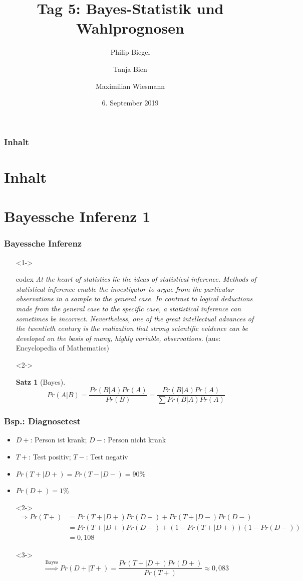 \documentclass[aspectratio=169,xcolor=dvipsnames]{beamer}
\title[Bayes-Statistik \& Wahlprognosen]{\textbf{Tag 5: Bayes-Statistik und Wahlprognosen}}
\author[Philip \and Tanja \and Maximilian]{Philip Biegel \and Tanja Bien \and Maximilian Wiesmann}
\institute[]{Sommerakademie der Studienstiftung Olang - Arbeitsgruppe 4: Empirische Wahlforschung und Wahlprognosen}
\date{6. September 2019}
\newtheorem{satz}{Satz}
\begin{document}
\begin{frame}
\titlepage
\end{frame}

\begin{frame}
\frametitle{Inhalt}
\section[Inhalt]{Inhalt}
\tableofcontents
\end{frame}

\section{Bayessche Inferenz 1}
\begin{frame}
\frametitle{Bayessche Inferenz}
\begin{itemize}
	\item[]<1-> 
	\begin{beamercolorbox}[sep=0.5em,wd=\textwidth,shadow=true,rounded=true]{codex}
		\textit{\glqq At the heart of statistics lie the ideas of statistical inference. Methods of statistical inference enable the investigator to argue from the particular observations in a sample to the general case. In contrast to logical deductions made from the general case to the specific case, a statistical inference can sometimes be incorrect. Nevertheless, one of the great intellectual advances of the twentieth century is the realization that strong scientific evidence can be developed on the basis of many, highly variable, observations.\grqq} (aus: Encyclopedia of Mathematics)
	\end{beamercolorbox}
	\item[]<2->
	\begin{satz}[Bayes]
		$$Pr(A|B) = \frac{Pr(B|A)Pr(A)}{Pr(B)} = \frac{Pr(B|A)Pr(A)}{\sum Pr(B|A)Pr(A)}$$
	\end{satz}
\end{itemize}
\end{frame}

\begin{frame}
\frametitle{Bsp.: Diagnosetest}
\begin{itemize}
	\item<1-> $D+$: Person ist krank; $D-$: Person nicht krank
	\item<1-> $T+$: Test positiv; $T-$: Test negativ
	\item<1-> $Pr(T+|D+)=Pr(T-|D-)=90\%$
	\item<1-> $Pr(D+)=1\%$
	\item[]<2-> \begin{align*}
				\Rightarrow Pr(T+) & = Pr(T+|D+)Pr(D+) + Pr(T+|D-)Pr(D-)\\ & = Pr(T+|D+)Pr(D+) + (1-Pr(T+|D+))(1-Pr(D-))\\ & = 0,108
			\end{align*}
	\item[]<3-> $$\overset{\text{Bayes}}{\Rightarrow} Pr(D+|T+) = \frac{Pr(T+|D+)Pr(D+)}{Pr(T+)}\approx 0,083$$
\end{itemize}
\end{frame}
\end{document}

